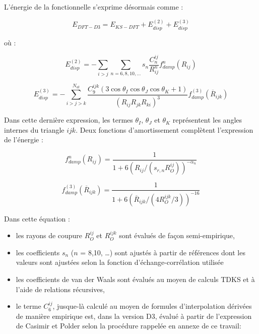 {	L'énergie de la fonctionnelle s’exprime désormais comme :
	
	\begin{equation}
	E_{DFT-D3} = E_{KS-DFT} + E_{disp}^{(2)} + E_{disp}^{(3)}
	\end{equation}
	
	où : 
	
	\begin{equation}
	E_{disp}^{(2)}=- \sum_{i>j} \sum_{n=6,8,10,…} s_{n} \frac{C_{n}^{ij}}{R_{ij}^{n}} f_{damp}^{n} (R_{ij})
	\end{equation}
	
	\begin{equation}
	E_{disp}^{(3)}= -\sum_{i>j>k}^{N_{at}} \frac{C_{9}^{ijk}(3\cos\theta_{I}\cos\theta_{J}\cos\theta_{K}+ 1)}{(R_{ij} R_{jk} R_{ki})^{3}} f_{damp}^{(3)} (\overline{R}_{ijk})
	\end{equation}
	
	Dans cette dernière expression, les termes $\theta_{I}$, $\theta_{J}$ et $\theta_{K}$ représentent les angles internes du triangle $ijk$. Deux fonctions d'amortissement complètent l’expression de l’énergie :
	
		\begin{equation} f_{damp}^{n} (R_{ij}) =\frac{1}{1+6(R_{ij} / (s_{r,n} R_{O}^{ij}))^{-\alpha_{n}}} \end{equation}  
		  
		\begin{equation} f_{damp}^{(3)} (\overline{R}_{ijk}) =\frac{1}{1+6(\overline{R}_{ijk} / (4 R_{O}^{ijk}/3))^{-16}}\end{equation}

	
	Dans cette équation : 
	\begin{itemize}
	\item les rayons de coupure $R_{O}^{ij}$ et $R_{O}^{ijk}$ sont évalués de façon semi-empirique,
	\item les coefficients $s_{n}$ ($n$ = 8,10, \dots) sont ajustés à partir de références dont les valeurs sont ajustées selon la fonction d’échange-corrélation utilisée
	\item les coefficients de van der Waals sont évalués au moyen de calculs TDKS et à l’aide de relations récursives,
	\item le terme $C_{6}^{ij}$, jusque-là calculé au moyen de formules d’interpolation dérivées de manière empirique est, dans la version D3, évalué à partir de l’expression de Casimir et Polder selon la procédure rappelée en annexe de ce travail: 
	\end{itemize}
	
}

